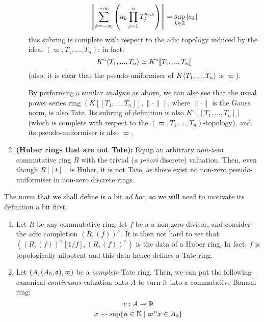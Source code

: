 \begin{example}
\begin{enumerate}
\begin{itemize}
                                $$\left\|\sum_{k = -\infty}^{+\infty} \left(a_k \prod_{j = 1}^n T_j^{d_{j, k}}\right)\right\| = \sup_{k \in \mathbb{Z}} |a_k|$$
                            this subring is complete with respect to the adic topology induced by the ideal $(\varpi, T_1, ..., T_n)$; in fact:
                                $$K^{\circ}\langle T_1, ..., T_n\rangle \simeq K^{\circ}[\![T_1, ..., T_n]\!]$$
                            (also, it is clear that the pseudo-uniformiser of $K\langle T_1, ..., T_n\rangle$ is $\varpi$).
                            
                            By performing a similar analysis as above, we can also see that the usual power series ring $(K[\![T_1, ..., T_n]\!], \|\cdot\|)$, where $\|\cdot\|$ is the Gauss norm, is also Tate. Its subring of definition is also $K^{\circ}[\![T_1, ..., T_n]\!]$ (which is complete with respect to the $(\varpi, T_1, ..., T_n)$-topology), and its pseudo-uniformiser is also $\varpi$.         
                        \end{itemize}
                    \item \textbf{(Huber rings that are not Tate):} Equip an arbitrary \textit{non-zero} commutative ring $R$ with the trivial (\textit{a priori} discrete) valuation. Then, even though $R[\![t]\!]$ is Huber, it is not Tate, as there exist no non-zero pseudo-uniformiser in non-zero discrete rings.  
                \end{enumerate}
            \end{example}
            \begin{remark} \label{remark: canonical_norm_for_tate_rings}
                The norm that we shall define is a bit \textit{ad hoc}, so we will need to motivate its definition a bit first.
                \begin{enumerate}
                    \item Let $R$ be any commutative ring, let $f$ be a a non-zero-divisor, and consider the adic completion $(R, (f))^{\wedge}$. It is then not hard to see that $\left((R, (f))^{\wedge}[1/f], (R, (f))^{\wedge}\right)$ is the data of a Huber ring. In fact, $f$ is topologically nilpotent and this data hence defines a Tate ring. 
                    \item Let $(A, (A_0, \mathfrak{a}), \varpi)$ be a \textit{complete} Tate ring. Then, we can put the following canonical \textit{continuous} valuation onto $A$ to turn it into a commutative Banach ring:
                        $$v: A \to \mathbb{R}$$
                        $$x \leadsto \sup\{n \in \mathbb{N} \mid \varpi^n x \in A_0\}$$
                
                \end{enumerate}
            \end{remark}
            
